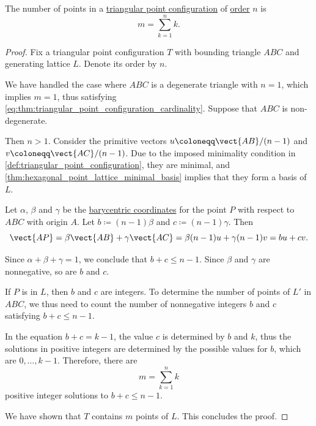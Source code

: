 \begin{proposition}\label{thm:triangular_point_configuration_cardinality}
  The number of points in a \hyperref[def:triangular_point_configuration]{triangular point configuration} of \hyperref[def:triangular_point_configuration_order]{order} \( n \) is
  \begin{equation}\label{eq:thm:triangular_point_configuration_cardinality}
    m = \sum_{k=1}^n k.
  \end{equation}
\end{proposition}
\begin{proof}
  Fix a triangular point configuration \( T \) with bounding triangle \( ABC \) and generating lattice \( L \). Denote its order by \( n \).

  We have handled the case where \( ABC \) is a degenerate triangle with \( n = 1 \), which implies \( m = 1 \), thus satisfying \eqref{eq:thm:triangular_point_configuration_cardinality}. Suppose that \( ABC \) is non-degenerate.

  Then \( n > 1 \). Consider the primitive vectors \( u \coloneqq \vect{AB} / (n - 1) \) and \( v \coloneqq \vect{AC} / (n - 1) \). Due to the imposed minimality condition in \cref{def:triangular_point_configuration}, they are minimal, and \cref{thm:hexagonal_point_lattice_minimal_basis} implies that they form a basis of \( L \).

  Let \( \alpha \), \( \beta \) and \( \gamma \) be the \hyperref[def:barycentric_coordinate_system]{barycentric coordinates} for the point \( P \) with respect to \( ABC \) with origin \( A \). Let \( b \coloneqq (n - 1)\beta \) and \( c \coloneqq (n - 1)\gamma \). Then
  \begin{equation*}
    \vect{AP} = \beta \vect{AB} + \gamma \vect{AC} = \beta (n - 1) u + \gamma (n - 1) v = bu + cv.
  \end{equation*}

  Since \( \alpha + \beta + \gamma = 1 \), we conclude that \( b + c \leq n - 1 \). Since \( \beta \) and \( \gamma \) are nonnegative, so are \( b \) and \( c \).

  If \( P \) is in \( L \), then \( b \) and \( c \) are integers. To determine the number of points of \( L' \) in \( ABC \), we thus need to count the number of nonnegative integers \( b \) and \( c \) satisfying \( b + c \leq n - 1 \).

  In the equation \( b + c = k - 1 \), the value \( c \) is determined by \( b \) and \( k \), thus the solutions in positive integers are determined by the possible values for \( b \), which are \( 0, \ldots, k - 1 \). Therefore, there are
  \begin{equation*}
    m = \sum_{k=1}^n k
  \end{equation*}
  positive integer solutions to \( b + c \leq n - 1 \).

  We have shown that \( T \) contains \( m \) points of \( L \). This concludes the proof.
\end{proof}

